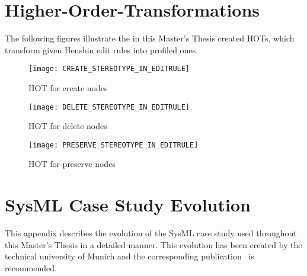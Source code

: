 \appendix
\chapter{Higher-Order-Transformations}\label{appendix:hots}
The following figures illustrate the in this Master's Thesis created \ac{HOT}s,
which transform given Henshin edit rules into profiled ones.
 \begin{figure}[h!]
\begin{center}
\texttt{[image: CREATE\_STEREOTYPE\_IN\_EDITRULE]}\\
\end{center}
\caption[]{\ac{HOT} for create nodes}
\label{hot_create}
\end{figure}
\newpage
\begin{figure}[h!]
\begin{center}
\texttt{[image: DELETE\_STEREOTYPE\_IN\_EDITRULE]}\\
\end{center}
\caption[]{\ac{HOT} for delete nodes}
\label{hot_delete}
\end{figure}
\newpage
\begin{figure}[h!]
\begin{center}
\texttt{[image: PRESERVE\_STEREOTYPE\_IN\_EDITRULE]}\\
\end{center}
\caption[]{\ac{HOT} for preserve nodes}
\label{hot_preserve}
\end{figure}
% 
% 
\chapter{\ac{SysML} Case Study Evolution}\label{appendix:sysml_casestudy}
This appendix describes the evolution of the \ac{SysML} case study used
throughout this Master's Thesis in a detailed manner. This evolution has been
created by the technical university of Munich and the corresponding
publication~\cite{aiscasestudy} is recommended.
